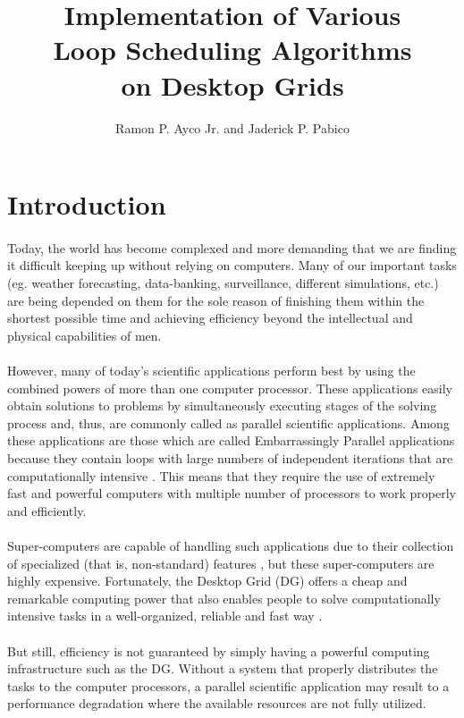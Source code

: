 \documentclass[10pt, twocolumn, letterpaper]{article}
\title{\textrm{\textbf{\textup{Implementation of Various\\Loop Scheduling Algorithms\\on Desktop Grids}}}}
\author{Ramon P. Ayco Jr. and Jaderick P. Pabico}
\date{}
\begin{document}
\maketitle

\section{Introduction}

\paragraph{}
Today, the world has become complexed and more demanding that we are finding it difficult keeping up without relying on computers. Many of our important tasks (eg. weather forecasting, data-banking, surveillance, different simulations, etc.) are being depended on them for the sole reason of finishing them within the shortest possible time and achieving efficiency beyond the intellectual and physical capabilities of men.

\paragraph{}
However, many of today\rq s scientific applications perform best by using the combined powers of more than one computer processor. These applications easily obtain solutions to problems by simultaneously executing stages of the solving process \cite{codenotti} and, thus, are commonly called as parallel scientific applications. Among these applications are those which are called Embarrassingly Parallel applications because they contain loops with large numbers of independent iterations that are computationally intensive \cite{pabico}. This means that they require the use of extremely fast and powerful computers with multiple number of processors to work properly and efficiently.

\paragraph{}
Super-computers are capable of handling such applications due to their collection of specialized (that is, non-standard) features \cite{morse}, but these super-computers are highly expensive. Fortunately, the Desktop Grid (DG) offers a cheap and remarkable computing power that also enables people to solve computationally intensive tasks in a well-organized, reliable and fast way \cite{desktopgrid.hu}.

\paragraph{}
But still, efficiency is not guaranteed by simply having a powerful computing infrastructure such as the DG. Without a system that properly distributes the tasks to the computer processors, a parallel scientific application may result to a performance degradation where the available resources are not fully utilized. 
\end{document}
